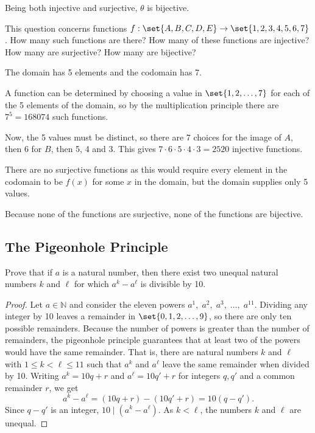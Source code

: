 \documentclass[DIN, pagenumber=false, fontsize=11pt, parskip=half]{scrartcl}
\begin{document}
\begin{problems}
    Being both injective and surjective, $\theta$ is bijective.

    \problem This question concerns functions $f : \set{A,B,C,D,E} \to \set{1,2,3,4,5,6,7}$. How many such functions are there? How many of these functions are injective? How many are surjective? How many are bijective?

    \answer The domain has 5 elements and the codomain has 7.

    A function can be determined by choosing a value in $\set{1,2,\dots,7}$ for each of the 5 elements of the domain, so by the multiplication principle there are $7^5 = 168074$ such functions.

    Now, the 5 values must be distinct, so there are 7 choices for the image of $A$, then 6 for $B$, then 5, 4 and 3. This gives $7 \cdot 6 \cdot 5 \cdot 4 \cdot 3 = 2520$  injective functions.

    There are no surjective functions as this would require every element in the codomain to be $f(x)$ for some $x$ in the domain, but the domain supplies only 5 values.
    
    Because none of the functions are surjective, none of the functions are bijective.
    
\end{problems}

\subsection{The Pigeonhole Principle}

\begin{problems}
    \problem Prove that if $a$ is a natural number, then there exist two unequal natural numbers $k$ and $\ell$ for which $a^k - a^\ell$ is divisible by 10.
    \begin{proof}
        Let $a \in \mathbb{N}$ and consider the eleven powers $a^1,\; a^2,\; a^3,\; \dots,\; a^{11}$.
        Dividing any integer by 10 leaves a remainder in $\set{0,1,2,\dots,9}$, so there are only ten possible remainders.
        Because the number of powers is greater than the number of remainders, the pigeonhole principle guarantees that at least two of the powers would have the same remainder.
        That is, there are natural numbers $k$ and $\ell$ with $1 \leq k < \ell \leq 11$ such that $a^k$ and $a^\ell$ leave the same remainder when divided by 10. Writing $a^k = 10q + r$ and $a^\ell = 10q' + r$ for integers $q, q'$ and a common remainder $r$, we get
        \[
            a^k - a^\ell = (10q + r) - (10q' + r) = 10(q - q').
        \]
        Since $q - q'$ is an integer, $10 \mid (a^k - a^\ell)$. As $k < \ell$, the numbers $k$ and $\ell$ are unequal.
    \end{proof}

\end{problems}
\end{document}
